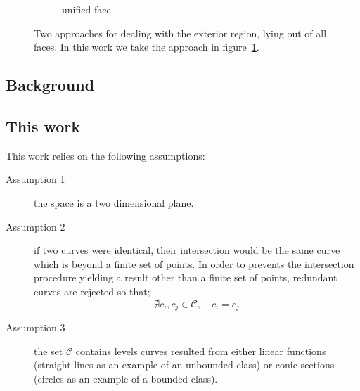 \begin{figure}
\begin{subfigure}{.32\textwidth}
    \caption{unified face} \label{subfig:intro_unboundedFaces_c}
  \end{subfigure}%
  \caption[xxx]
          {Two approaches for dealing with the exterior region, lying out of all faces.
          In this work we take the approach in figure~\ref{subfig:intro_unboundedFaces_c}.}
  \label{fig:subd_superface}
\end{figure}

\subsection{Background}


\subsection{This work}

This work relies on the following assumptions:
\begin{description}
\item [Assumption 1] the space is a two dimensional plane.
\item [Assumption 2] if two curves were identical, their intersection would be the same curve which is beyond a finite set of points.
  In order to prevents the intersection procedure yielding a result other than a finite set of points, redundant curves are rejected so that;
  \[ \nexists c_i , c_j \in \mathcal{C}, \quad c_i = c_j \]
\item [Assumption 3] the set $\mathcal{C}$ contains levels curves resulted from either linear functions (straight lines as an example of an unbounded class) or conic sections (circles as an example of a bounded class).
\end{description}



